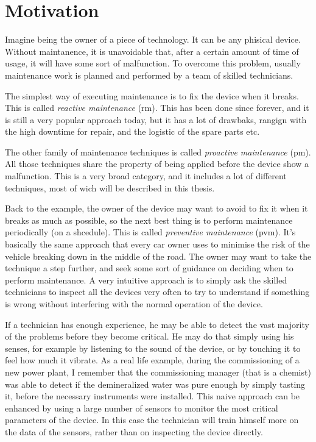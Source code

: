 \section{Motivation}
\label{sec:motivation}
Imagine being the owner of a piece of technology. It can be any phisical device. Without maintanence, it is unavoidable that, after a certain amount of time of usage, it will have some sort of malfunction.
To overcome this problem, usually maintenance work is planned and performed by a team of skilled technicians. 

The simplest way of executing maintenance is to fix the device when it breaks. This is called \emph{reactive maintenance} (\gls{rm}). This has been done since forever, and it is still a very popular approach today, but it has a lot of drawbaks, rangign with the high downtime for repair, and the logistic of the spare parts etc.

The other family of maintenance techniques is called \emph{proactive maintenance} (\gls{pm}). All those techniques share the property of being applied before the device show a malfunction. This is a very broad category, and it includes a lot of different techniques, most of wich will be described in this thesis.

Back to the example, the owner of the device may want to avoid to fix it when it breaks as much as possible, so the next best thing is to perform maintenance periodically (on a shcedule). This is called \emph{preventive maintenance} (\gls{pvm}). It's basically the same approach that every car owner uses to minimise the risk of the vehicle breaking down in the middle of the road. 
The owner may want to take the technique a step further, and seek some sort of guidance on deciding when to perform maintenance. A very intuitive approach is to simply ask the skilled technicians to inspect all the devices very often to try to understand if something is wrong without interfering with the normal operation of the device.

If a technician has enough experience, he may be able to detect the vast majority of the problems before they become critical. He may do that simply using his senses, for example by listening to the sound of the device, or by touching it to feel how much it vibrate. 
As a real life example, during the commissioning of a new power plant, I remember that the commissioning manager (that is a chemist) was able to detect if the demineralized water was pure enough by simply tasting it, before the necessary instruments were installed.
This naive approach can be enhanced by using a large number of sensors to monitor the most critical parameters of the device. In this case the technician will train himself more on the data of the sensors, rather than on inspecting the device directly. 

